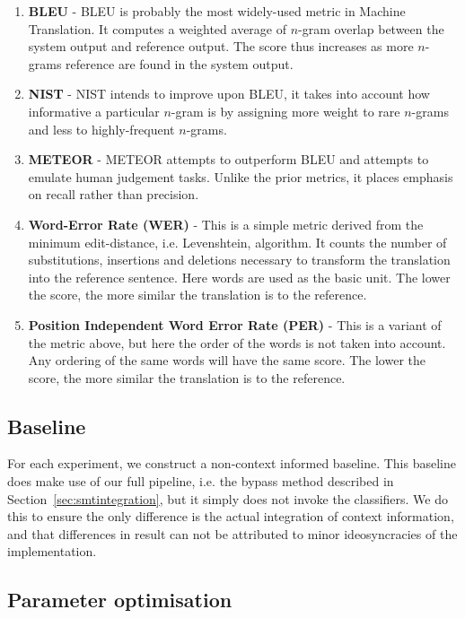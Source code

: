 \documentclass[11pt]{article}
\theoremstyle{break}
\begin{document}
\begin{enumerate} %
\item \textbf{BLEU} - BLEU \citep{BLEU} is probably the most widely-used metric
in Machine Translation. It computes a weighted average of $n$-gram overlap
between the system output and reference output. The score thus increases as
more $n$-grams reference are found in the system output.
\item \textbf{NIST} - NIST intends to improve upon BLEU, it takes into account
how informative a particular $n$-gram is by assigning more weight to rare
$n$-grams and less to highly-frequent $n$-grams.  \item \textbf{METEOR} -
METEOR \citep{METEOR} attempts to outperform BLEU and attempts to emulate human
judgement tasks. Unlike the prior metrics, it places emphasis on recall rather
than precision.
\item \textbf{Word-Error Rate (WER)} - This is a simple metric derived from the
minimum edit-distance, i.e. Levenshtein, algorithm. It counts the number of
substitutions, insertions and deletions necessary to transform the translation
into the reference sentence. Here words are used as the basic unit. The lower
the score, the more similar the translation is to the reference.  
\item \textbf{Position Independent Word Error Rate (PER)} - This is a variant of the
metric above, but here the order of the words is not taken into account. Any
ordering of the same words will have the same score. The lower the score, the
more similar the translation is to the reference.
\end{enumerate}

\subsection{Baseline}

For each experiment, we construct a non-context informed baseline. This
baseline does make use of our full pipeline, i.e. the bypass method described
in Section~\ref{sec:smtintegration}, but it simply does not invoke the
classifiers.  We do this to ensure the only difference is the actual
integration of context information, and that differences in result can not be
attributed to minor ideosyncracies of the implementation.

\subsection{Parameter optimisation}
\end{document}
